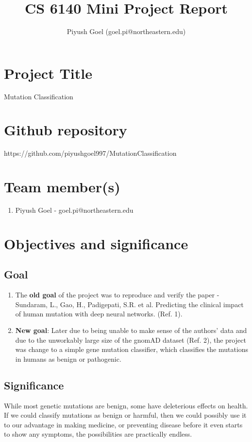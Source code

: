 \documentclass[twoside]{article}
\title{CS 6140 Mini Project Report}
\author{Piyush Goel (goel.pi@northeastern.edu)}
\begin{document}
		
	\maketitle
	
	\section{Project Title}
	Mutation Classification
	
	\section{Github repository}
	https://github.com/piyushgoel997/MutationClassification
	
	
	\section{Team member(s)}
	\begin{enumerate}
		\item Piyush Goel - goel.pi@northeastern.edu
	\end{enumerate}
	
	\newpage
	
	\section{Objectives and significance}
	\subsection{Goal}
     \begin{enumerate}
		\item The \textbf{old goal} of the project was to reproduce and verify the paper - Sundaram, L., Gao, H., Padigepati, S.R. et al. Predicting the clinical impact of human mutation with deep neural networks. (Ref. 1).
		\item \textbf{New goal}: Later due to being unable to make sense of the authors' data and due to the unworkably large size of the gnomAD dataset (Ref. 2), the project was change to a simple gene mutation classifier, which classifies the mutations in humans as benign or pathogenic.
	\end{enumerate}
	\subsection{Significance}
	While most genetic mutations are benign, some have deleterious effects on health. If we could classify mutations as benign or harmful, then we could possibly use it to our advantage in making medicine, or preventing disease before it even starts to show any symptoms, the possibilities are practically endless.
\end{document}
